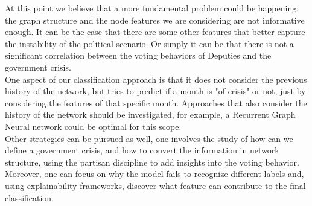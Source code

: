At this point we believe that a more fundamental problem could be happening: the graph structure and the node features we are considering are not informative enough. It can be the case that there are some other features that better capture the instability of the political scenario. Or simply it can be that there is not a significant correlation between the voting behaviors of Deputies and the government crisis.\\

One aspect of our classification approach is that it does not consider the previous history of the network, but tries to predict if a month is "of crisis" or not, just by considering the features of that specific month. Approaches that also consider the history of the network should be investigated, for example, a Recurrent Graph Neural network could be optimal for this scope.\\

Other strategies can be pursued as well, one involves the study of how can we define a government crisis, and how to convert the information in network structure, using the partisan discipline to add insights into the voting behavior. Moreover, one can focus on why the model fails to recognize different labels and, using explainability frameworks, discover what feature can contribute to the final classification.


